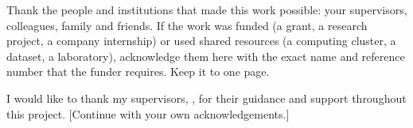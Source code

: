 
\begin{guidance}
Thank the people and institutions that made this work possible: your supervisors,
colleagues, family and friends. If the work was funded (a grant, a research project,
a company internship) or used shared resources (a computing cluster, a dataset, a
laboratory), acknowledge them here with the exact name and reference number that the
funder requires. Keep it to one page.
\end{guidance}

I would like to thank my supervisors, \thesissupervisors, for their guidance and
support throughout this project. [Continue with your own acknowledgements.]

\cleardoublepage
